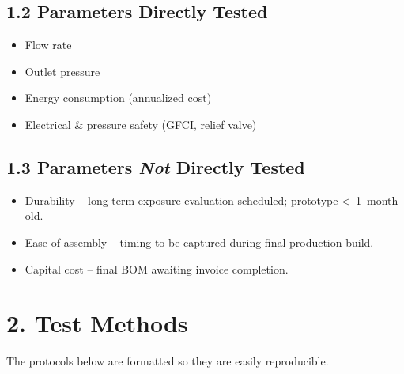 \documentclass[12pt]{article}
\begin{document}
\subsection*{1.2 Parameters Directly Tested}
\begin{itemize}[leftmargin=*]
  \item Flow rate
  \item Outlet pressure
  \item Energy consumption (annualized cost)
  \item Electrical \& pressure safety (GFCI, relief valve)
\end{itemize}

\subsection*{1.3 Parameters \emph{Not} Directly Tested}
\begin{itemize}[leftmargin=*]
  \item Durability – long‐term exposure evaluation scheduled; prototype < 1 month old.
  \item Ease of assembly – timing to be captured during final production build.
  \item Capital cost – final BOM awaiting invoice completion.
\end{itemize}

\newpage
\section*{2. Test Methods}
The protocols below are formatted so they are easily reproducible.
\end{document}
